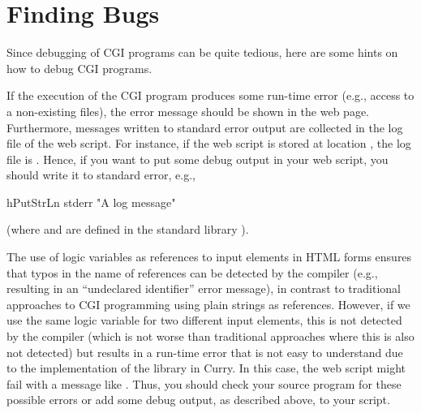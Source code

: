 \section{Finding Bugs}

Since debugging of CGI programs can be quite tedious,
here are some hints on how to debug CGI programs.

If the execution of the CGI program produces some run-time error
(e.g., access to a non-existing files), the error message
should be shown in the web page.
Furthermore, messages written to standard error output
are collected in the log file of the web script.
For instance, if the web script is stored at location
,
the log file is .
Hence, if you want to put some debug output in your web script,
you should write it to standard error, e.g.,
%
\begin{prog}
hPutStrLn stderr "A log message"
\end{prog}
%
(where  and  are defined
in the standard library ).


The use of logic variables as references to input elements
in HTML forms ensures that typos in the name of references
can be detected by the compiler (e.g., resulting in an
``undeclared identifier'' error message), in contrast
to traditional approaches to CGI programming using plain strings
as references.
However, if we use the same logic variable for two different
input elements, this is not detected by the compiler
(which is not worse than traditional approaches where this
is also not detected) but results in a run-time error
that is not easy to understand due to the implementation
of the library  in Curry.
In this case, the web script might fail with a message like
.
Thus, you should check your source program for these possible errors
or add some debug output, as described above, to your script.


